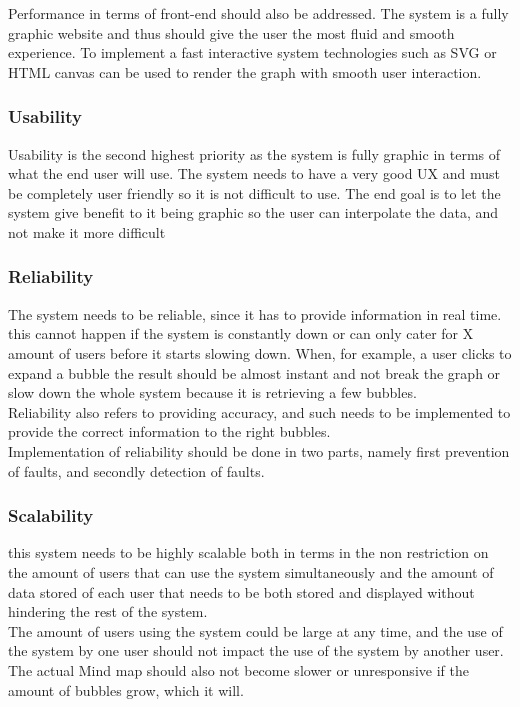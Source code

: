 \documentclass[hidelinks,english]{article}
\begin{document}
                Performance in terms of front-end should also be addressed. The system is a fully graphic website and thus should give the user the most fluid and smooth experience. To implement a fast interactive system technologies such as SVG or HTML canvas can be used to render the graph with smooth user interaction.
            \subsubsection{Usability}
                Usability is the second highest priority as the system is fully graphic in terms of what the end user will use. The system needs to have a very good UX and must be completely user friendly so it is not difficult to use. The end goal is to let the system give benefit to it being graphic so the user can interpolate the data, and not make it more difficult
            \subsubsection{Reliability}
                The system needs to be reliable, since it has to provide information in real time. this cannot happen if the system is constantly down or can only cater for X amount of users before it starts slowing down. When, for example, a user clicks to expand a bubble the result should be almost instant and not break the graph or slow down the whole system because it is retrieving a few bubbles.\\
                
                Reliability also refers to providing accuracy, and such needs to be implemented to provide the correct information to the right bubbles.
                \\
                Implementation of reliability should be done in two parts, namely first prevention of faults, and secondly detection of faults.
            \subsubsection{Scalability}
                this system needs to be highly scalable both in terms in the non restriction on the amount of users that can use the system simultaneously and the amount of data stored of each user that needs to be both stored and displayed without hindering the rest of the system.\\
            
                The amount of users using the system could be large at any time, and the use of the system by one user should not impact the use of the system by another user. The actual Mind map should also not become slower or unresponsive if the amount of bubbles grow, which it will.\\
                
\end{document}
